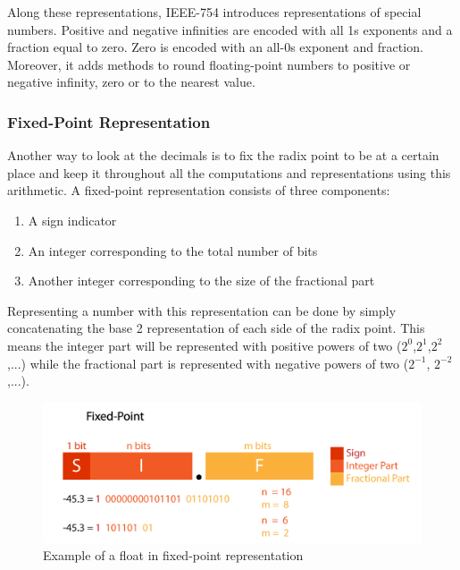 
Along these representations, IEEE-754 introduces representations of special numbers. Positive and negative infinities are encoded with all 1s exponents and a fraction equal to zero. Zero is encoded with an all-0s exponent and fraction. Moreover, it adds methods to round floating-point numbers to positive or negative infinity, zero or to the nearest value.

\subsubsection{Fixed-Point Representation}

Another way to look at the decimals is to fix the radix point to be at a certain place and keep it throughout all the computations and representations using this arithmetic. A fixed-point representation consists of three components:
\begin{enumerate}
  \item A sign indicator
  \item An integer corresponding to the total number of bits
  \item Another integer corresponding to the size of the fractional part
\end{enumerate}

Representing a number with this representation can be done by simply concatenating the base 2 representation of each side of the radix point. This means the integer part will be represented with positive powers of two ($2^0$,$2^1$,$2^2$,...) while the fractional part is represented with negative powers of two ($2^{-1}$, $2^{-2}$,...).

\begin{figure}[htbp]
	\centering
		\includegraphics[width=.8\textwidth]{Figures/FixedPoint.png}
	\caption[Fixed-Point Representation]{Example of a float in fixed-point representation}
	\label{fig:FixedPoint}
\end{figure}

